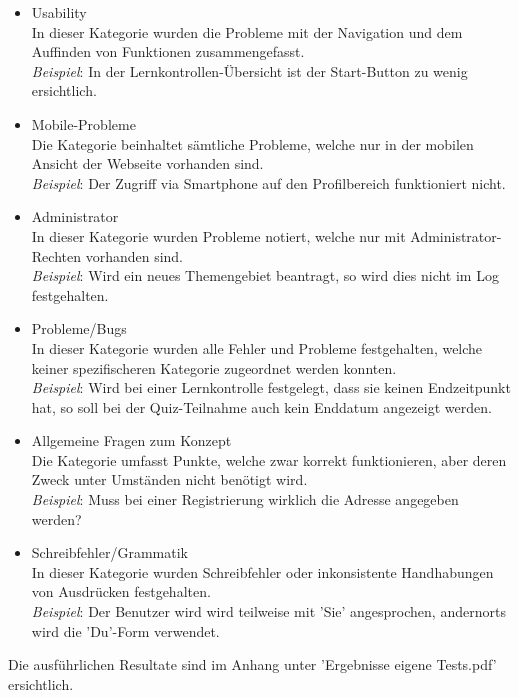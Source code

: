 \begin{itemize}
		
		\item Usability \\
		In dieser Kategorie wurden die Probleme mit der Navigation und dem Auffinden von Funktionen zusammengefasst. \\
		\textit{Beispiel}: In der Lernkontrollen-Übersicht ist der Start-Button zu wenig ersichtlich.
		\item Mobile-Probleme \\
		Die Kategorie beinhaltet sämtliche Probleme, welche nur in der mobilen Ansicht der Webseite vorhanden sind. \\
		\textit{Beispiel}: Der Zugriff via Smartphone auf den Profilbereich funktioniert nicht.
		\item Administrator \\
		In dieser Kategorie wurden Probleme notiert, welche nur mit Administrator-Rechten vorhanden sind. \\
		\textit{Beispiel}: Wird ein neues Themengebiet beantragt, so wird dies nicht im Log festgehalten.
		\item Probleme/Bugs \\
		In dieser Kategorie wurden alle Fehler und Probleme festgehalten, welche keiner spezifischeren Kategorie zugeordnet werden konnten. \\
		\textit{Beispiel}: Wird bei einer Lernkontrolle festgelegt, dass sie keinen Endzeitpunkt hat, so soll bei der Quiz-Teilnahme auch kein Enddatum angezeigt werden.
		\item Allgemeine Fragen zum Konzept \\
		Die Kategorie umfasst Punkte, welche zwar korrekt funktionieren, aber deren Zweck unter Umständen nicht benötigt wird. \\
		\textit{Beispiel}: Muss bei einer Registrierung wirklich die Adresse angegeben werden?
		\item Schreibfehler/Grammatik \\
		In dieser Kategorie wurden Schreibfehler oder inkonsistente Handhabungen von Ausdrücken festgehalten. \\
		\textit{Beispiel}: Der Benutzer wird wird teilweise mit 'Sie' angesprochen, andernorts wird die 'Du'-Form verwendet.
	\end{itemize}

	Die ausführlichen Resultate sind im Anhang unter 'Ergebnisse eigene Tests.pdf' ersichtlich.
	


